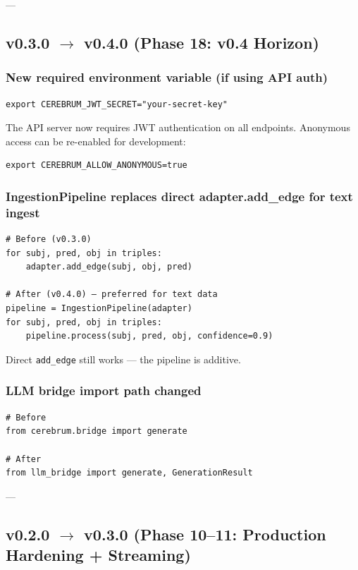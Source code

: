 \documentclass[11pt,article,oneside]{memoir}
\begin{document}
---

\subsection{v0.3.0 $\to$ v0.4.0 (Phase 18: v0.4 Horizon)}

\subsubsection{New required environment variable (if using API auth)}
\begin{lstlisting}
export CEREBRUM_JWT_SECRET="your-secret-key"
\end{lstlisting}

The API server now requires JWT authe\-ntication on all endpoints. Anonymous access can be re-enabled for development:
\begin{lstlisting}
export CEREBRUM_ALLOW_ANONYMOUS=true
\end{lstlisting}

\subsubsection{IngestionPipeline replaces direct adapter.add\_edge for text ingest}
\begin{lstlisting}
# Before (v0.3.0)
for subj, pred, obj in triples:
    adapter.add_edge(subj, obj, pred)

# After (v0.4.0) — preferred for text data
pipeline = IngestionPipeline(adapter)
for subj, pred, obj in triples:
    pipeline.process(subj, pred, obj, confidence=0.9)
\end{lstlisting}

Direct \texttt{add\_edge} still works — the pipeline is additive.

\subsubsection{LLM bridge import path changed}
\begin{lstlisting}
# Before
from cerebrum.bridge import generate

# After
from llm_bridge import generate, GenerationResult
\end{lstlisting}

---

\subsection{v0.2.0 $\to$ v0.3.0 (Phase 10–11: Production Hardening + Streaming)}
\end{document}
